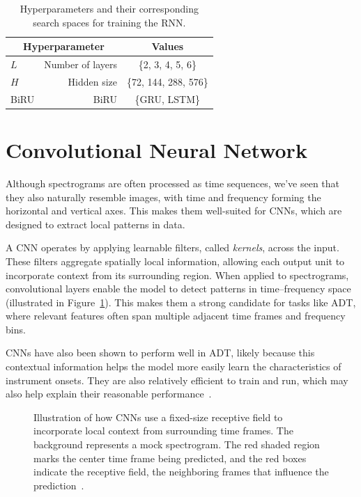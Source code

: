 \begin{table}[H]
    \centering
    \begin{tabular}{lr|c}
        \multicolumn{2}{c|}{Hyperparameter} & Values       \\
        \hline
        $L$ & Number of layers      & \{2, 3, 4, 5, 6\} \\
        $H$ & Hidden size      & \{72, 144, 288, 576\} \\
        \gls{BiRU} & \acrlong{BiRU} & \{\gls{GRU}, \gls{LSTM}\}\\
    \end{tabular}
    \caption{Hyperparameters and their corresponding search spaces for training the \acrlong{RNN}.}
    \label{RNNHyperparams}
\end{table}

\section{Convolutional Neural Network}

Although spectrograms are often processed as time sequences, we've seen that they also naturally resemble images, with time and frequency forming the horizontal and vertical axes. This makes them well-suited for \glspl{CNN}, which are designed to extract local patterns in data.

A \gls{CNN} operates by applying learnable filters, called \textit{kernels}, across the input. These filters aggregate spatially local information, allowing each output unit to incorporate context from its surrounding region. When applied to spectrograms, convolutional layers enable the model to detect patterns in time–frequency space (illustrated in Figure~\ref{CNNInfluenceFigure}). This makes them a strong candidate for tasks like \gls{ADT}, where relevant features often span multiple adjacent time frames and frequency bins.

\glspl{CNN} have also been shown to perform well in \gls{ADT}, likely because this contextual information helps the model more easily learn the characteristics of instrument onsets. They are also relatively efficient to train and run, which may also help explain their reasonable performance~\cite{Vogl2017DrumTV}.

\begin{figure}[H]
    \centering
    
    \caption{Illustration of how \glspl{CNN} use a fixed-size receptive field to incorporate local context from surrounding time frames. The background represents a mock spectrogram. The red shaded region marks the center time frame being predicted, and the red boxes indicate the receptive field, the neighboring frames that influence the prediction~\cite{Vogl2017DrumTV}.}
    \label{CNNInfluenceFigure}
\end{figure}


